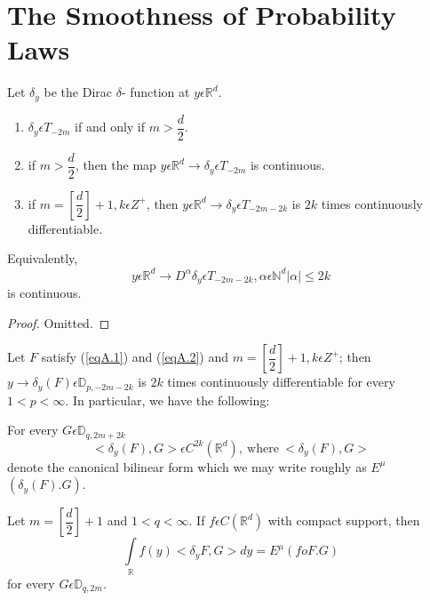 \section{The Smoothness of Probability Laws}%

\setcounter{lem}{0}
\begin{lem}\label{chap1:addlem1}%
  Let $\delta_y$ be the Dirac $\delta $- function at $y \epsilon 
  \mathbb{R}^d$. 
  \begin{enumerate}[\rm (i)]
  \item $\delta_y \epsilon  T_{-2m}$ if and only if $ m >\dfrac {d}{2}$.
  \item if $m > \dfrac{d}{2}$, then the map $ y \epsilon  \mathbb{R}^d
    \to \delta_y \epsilon  T_{-2m}$ is continuous. 
  \item if $m=\left[\dfrac{d}{2}\right]+1, k \epsilon  Z^+$, then $y
    \epsilon  \mathbb{R}^d \to \delta_y \epsilon  T_{-2m-2k}$ is
    $2k$ times continuously differentiable. 
  \end{enumerate}
\end{lem}

Equivalently,
$$
y \epsilon  \mathbb{R}^d \to D^\alpha \delta_y \epsilon  T_{-2m
  -2k}, \alpha \epsilon \mathbb{N}^d |\alpha | \le 2k 
$$
is continuous.
\begin{proof}
  Omitted.\pageoriginale
\end{proof}

\begin{coro*}
  Let $F$ satisfy (\ref{eqA.1}) and (\ref{eqA.2}) and $m
  =\left[\dfrac{d}{2}\right]+1, k 
  \epsilon  Z^+$; then $y \to \delta_y (F) \epsilon  \mathbb{D}_{p,
    -2m-2k}$ is $2k$ times continuously differentiable for every $1 < p
  < \infty$. In particular, we have the following:  
  
  For every $G \epsilon  \mathbb{D}_{q,2m+2k}$
  $$
  < \delta_y (F),G > \epsilon  C^{2k}(\mathbb{R}^d), ~\text{where}~ <
  \delta_y (F),G >
  $$
  denote the canonical bilinear form which we may write roughly as
  $E^\mu$ $(\delta_y(F).G)$. 
\end{coro*}

\begin{lem}\label{chap1:addlem2}%
  Let $m=\left[\dfrac{d}{2}\right]+1$ and $1<q<\infty$. If $f \epsilon 
  C(\mathbb{R}^d)$ with compact support, then 
  $$
  \int \limits_{\mathbb{R}} f(y)< \delta_y F,G > dy = E^\mu (foF.G)
  $$
  for every $G \epsilon  \mathbb{D}_{q,2m}$.
\end{lem}

